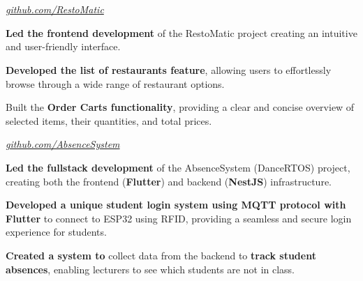 \documentclass[../main.tex]{subfiles}
\begin{document}
\section{}

\begin{twocolentry}{
    \small
    \textit{\href{https://github.com/SistemBasisData2023/RestoMatic}{github.com/RestoMatic}}
}
\end{twocolentry}

\vspace{0.10 cm}
\begin{onecolentry}
\begin{highlights}
    \item \textbf{Led the frontend development} of the RestoMatic project creating an intuitive and user-friendly interface.
    \item \textbf{Developed the list of restaurants feature}, allowing users to effortlessly browse through a wide range of restaurant options.
    \item Built the \textbf{Order Carts functionality}, providing a clear and concise overview of selected items, their quantities, and total prices.
\end{highlights}
\end{onecolentry}

\vspace{0.2 cm}

\begin{twocolentry}{
    \small
    \textit{\href{https://github.com/cattyman919/AbsenceSystem/tree/main}{github.com/AbsenceSystem}}
}
\end{twocolentry}

\vspace{0.10 cm}
\begin{onecolentry}
\begin{highlights}
    \item \textbf{Led the fullstack development} of the AbsenceSystem (DanceRTOS) project, creating both the frontend (\textbf{Flutter}) and backend (\textbf{NestJS}) infrastructure.
    \item \textbf{Developed a unique student login system using MQTT protocol with Flutter} to connect to ESP32 using RFID, providing a seamless and secure login experience for students.
    \item \textbf{Created a system to} collect data from the backend to \textbf{track student absences}, enabling lecturers to see which students are not in class.
\end{highlights}
\end{onecolentry}
\end{document}
